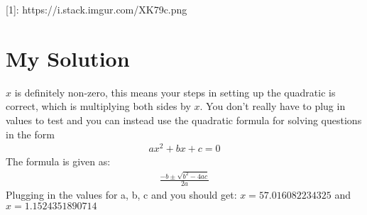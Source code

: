 \documentclass{article}
\begin{document}
  [1]: https://i.stack.imgur.com/XK79c.png
\section{My Solution}
$x$ is definitely non-zero, this means your steps in setting up the quadratic is correct, which is multiplying both sides by $x$.
You don't really have to plug in values to test and you can instead use the quadratic formula for solving questions in the form \begin{align}ax^2+bx+c=0\end{align}
The formula is given as:
\begin{align}\frac{-b\pm\sqrt{b^2-4ac}}{2a}\end{align}
Plugging in the values for a, b, c and you should get:
$x=57.016082234325$ and 
$x=1.1524351890714$
\end{document}

